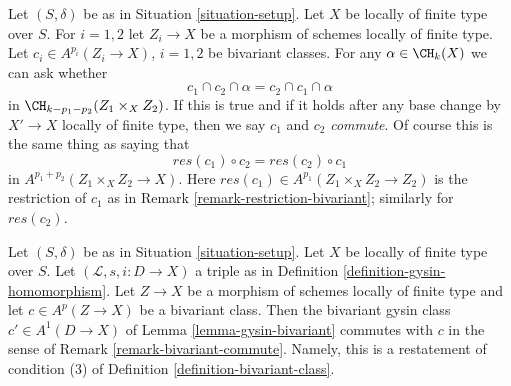 \begin{remark}
\label{remark-bivariant-commute}
Let $(S, \delta)$ be as in Situation \ref{situation-setup}. Let $X$ be
locally of finite type over $S$. For $i = 1, 2$ let $Z_i \to X$
be a morphism of schemes locally of finite type. Let
$c_i \in A^{p_i}(Z_i \to X)$, $i = 1, 2$ be bivariant classes.
For any $\alpha \in \CH_k(X)$ we can ask whether
$$
c_1 \cap c_2 \cap \alpha = c_2 \cap c_1 \cap \alpha
$$
in $\CH_{k - p_1 - p_2}(Z_1 \times_X Z_2)$. If this is true and if it holds
after any base change by $X' \to X$ locally of finite type, then we say
$c_1$ and $c_2$ {\it commute}. Of course this is the same thing as saying that
$$
res(c_1) \circ c_2 = res(c_2) \circ c_1
$$
in $A^{p_1 + p_2}(Z_1 \times_X Z_2 \to X)$. Here
$res(c_1) \in A^{p_1}(Z_1 \times_X Z_2 \to Z_2)$ is the restriction of $c_1$
as in Remark \ref{remark-restriction-bivariant}; similarly for $res(c_2)$.
\end{remark}

\begin{example}
\label{example-gysin-commute}
Let $(S, \delta)$ be as in Situation \ref{situation-setup}. Let $X$ be locally
of finite type over $S$. Let $(\mathcal{L}, s, i : D \to X)$ a triple as in
Definition \ref{definition-gysin-homomorphism}. Let $Z \to X$ be a morphism
of schemes locally of finite type and let $c \in A^p(Z \to X)$ be a
bivariant class. Then the bivariant gysin class $c' \in A^1(D \to X)$ of
Lemma \ref{lemma-gysin-bivariant} commutes with $c$ in the sense of
Remark \ref{remark-bivariant-commute}. Namely, this is a restatement of
condition (3) of Definition \ref{definition-bivariant-class}.
\end{example}

